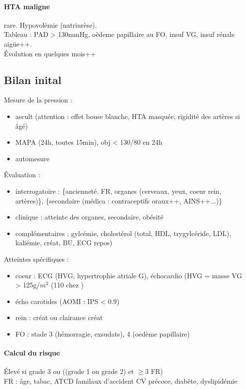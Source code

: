 \documentclass{article}
\begin{document}
\paragraph{HTA maligne} rare. Hypovolémie (natriurèse). \\
Tableau : PAD > 130mmHg, oèdeme papillaire au FO, insuf VG, insuf rénale
aigüe++. \\
Évolution en quelques mois++

\subsection{Bilan inital}
Mesure de la pression : 
\begin{itemize}
  \item ascult (attention : effet bouse blanche, HTA masquée, rigidité des
    artères si âgé)
  \item MAPA (24h, toutes 15min), obj < 130/80 en 24h
  \item automesure 
\end{itemize}
Évaluation :
\begin{itemize}
  \item interrogatoire : \{ancienneté, FR, organes (cerveaux, yeux, coeur rein,
    artères)\}, \{secondaire (médica : contraceptifs oraux++, AINS++...)\}
  \item clinique : atteinte des organes, secondaire, obésité
  \item complémentaires : gylcémie, cholestérol (total, HDL, trygylcéride, LDL),
kaliémie, créat, BU, ECG repos)
\end{itemize}
Atteintes spécifiques :
\begin{itemize}
  \item coeur : ECG (HVG, hypertrophie atriale G), échocardio (HVG = masse VG >
    125g/$m^2$ (110 chez \female)
  \item écho carotides (AOMI : IPS < 0.9)
  \item rein : \inc créat ou \dec clairance créat
  \item FO : stade 3 (hémorragie, exsudats), 4 (oedème papillaire)
\end{itemize}

\paragraph{Calcul du risque}
Élevé si grade 3 ou ((grade 1 ou grade 2) et $\ge 3$ FR)\\
FR : âge, tabac, ATCD familaux d'accident CV précoce, diabète, dyslipidémie
\end{document}
